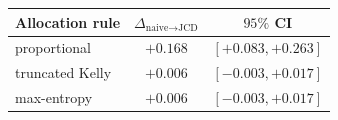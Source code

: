 \begin{tabular}{@{}lcc@{}}
\toprule
Allocation rule    & $\Delta_{\text{naive}\to\text{JCD}}$ & $95\%$ CI            \\
\midrule
proportional       & $+0.168$                             & $[+0.083, +0.263]$   \\
truncated Kelly    & $+0.006$                             & $[-0.003, +0.017]$   \\
max-entropy        & $+0.006$                             & $[-0.003, +0.017]$   \\
\bottomrule
\end{tabular}

